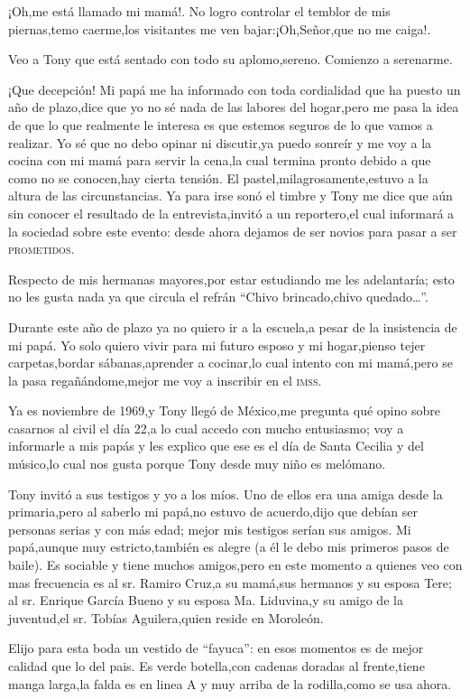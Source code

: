 \documentclass[letterpaper,12pt]{book}
\begin{document}
¡Oh,me está llamado mi mamá!. No logro controlar el temblor de mis piernas,temo caerme,los visitantes me ven bajar:¡Oh,Señor,que no me caiga!.

Veo a Tony que está sentado con todo su aplomo,sereno. Comienzo a serenarme.

¡Que decepción! Mi papá me ha informado con toda cordialidad que ha puesto un año de plazo,dice que yo no sé nada de las labores del hogar,pero me pasa la idea de que lo que realmente le interesa es que estemos seguros de lo que vamos a realizar. Yo sé que no debo opinar ni discutir,ya puedo sonreír y me voy a la cocina con mi mamá para servir la cena,la cual termina pronto debido a que como no se conocen,hay cierta tensión. El pastel,milagrosamente,estuvo a la altura de las circunstancias. Ya para irse sonó el timbre y Tony me dice que aún sin conocer el resultado de la entrevista,invitó a un reportero,el cual informará a la sociedad sobre este evento: desde ahora dejamos de ser novios para pasar a ser \textsc{prometidos}.

Respecto de mis hermanas mayores,por estar estudiando me les adelantaría; esto no les gusta nada ya que circula el refrán ``Chivo brincado,chivo quedado\ldots''.

Durante este año de plazo ya no quiero ir a la escuela,a pesar de la insistencia de mi papá. Yo solo quiero vivir para mi futuro esposo y mi hogar,pienso tejer carpetas,bordar sábanas,aprender a cocinar,lo cual intento con mi mamá,pero se la pasa regañándome,mejor me voy a inscribir en el \textsc{imss}.

Ya es noviembre de 1969,y Tony llegó de México,me pregunta qué opino sobre casarnos al civil el día 22,a lo cual accedo con mucho entusiasmo; voy a informarle a mis papás y les explico que ese es el día de Santa Cecilia y del músico,lo cual nos gusta porque Tony desde muy niño es melómano.

Tony invitó a sus testigos y yo a los míos. Uno de ellos era una amiga desde la primaria,pero al saberlo mi papá,no estuvo de acuerdo,dijo que debían ser personas serias y con más edad; mejor mis testigos serían sus amigos. Mi papá,aunque muy estricto,también es alegre (a él le debo mis primeros pasos de baile). Es sociable y tiene muchos amigos,pero en este momento a quienes veo con mas frecuencia es al sr. Ramiro Cruz,a su mamá,sus hermanos y su esposa Tere; al sr. Enrique García Bueno y su esposa Ma. Liduvina,y su amigo de la juventud,el sr. Tobías Aguilera,quien reside en Moroleón.

Elijo para esta boda un vestido de ``fayuca'': en esos momentos es de mejor calidad que lo del pais. Es verde botella,con cadenas doradas al frente,tiene manga larga,la falda es en linea A y muy arriba de la rodilla,como se usa ahora.
\end{document}
